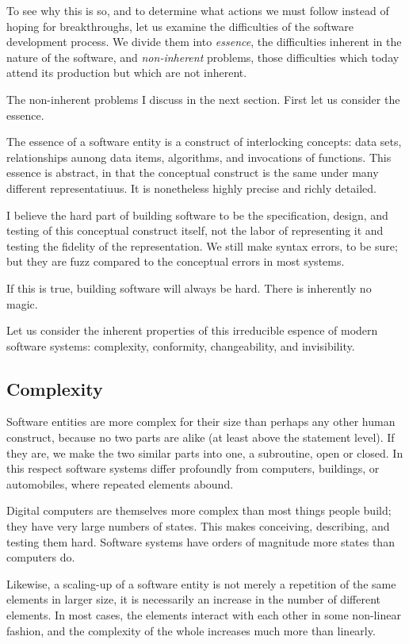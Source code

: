 \documentclass[11pt,final]{article}
\begin{document}
To see why this is so, and to determine what actions we must follow instead of
hoping for breakthroughs, let us examine the difficulties of the software
development process. We divide them into \emph{essence}, the difficulties
inherent in the nature of the software, and \emph{non-inherent} problems, those
difficulties which today attend its production but which are not inherent.

The non-inherent problems I discuss in the next section. First let us consider
the essence.

The essence of a software entity is a construct of interlocking concepts: data
sets, relationships aunong data items, algorithms, and invocations of
functions. This essence is abstract, in that the conceptual construct is the
same under many different representatiuus.  It is nonetheless highly precise
and richly detailed.

I believe the hard part of building software to be the specification, design,
and testing of this conceptual construct itself, not the labor of representing
it and testing the fidelity of the representation. We still make syntax errors,
to be sure; but they are fuzz compared to the conceptual errors in most
systems.

If this is true, building software will always be hard. There is inherently no
magic.

Let us consider the inherent properties of this irreducible espence of modern
software systems: complexity, conformity, changeability, and invisibility.

\subsection*{Complexity}

Software entities are more complex for their size than perhaps any other human
construct, because no two parts are alike (at least above the statement level).
If they are, we make the two similar parts into one, a subroutine, open or
closed. In this respect software systems differ profoundly from computers,
buildings, or automobiles, where repeated elements abound.

Digital computers are themselves more complex than most things people build;
they have very large numbers of states. This makes conceiving, describing, and
testing them hard. Software systems have orders of magnitude more states than
computers do.

Likewise, a scaling-up of a software entity is not merely a repetition of the
same elements in larger size, it is necessarily an increase in the number of
different elements.  In most cases, the elements interact with each other in
some non-linear fashion, and the complexity of the whole increases much more
than linearly.
\end{document}
